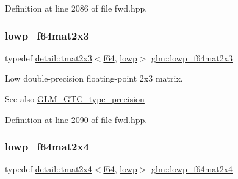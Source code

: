 Definition at line 2086 of file fwd.\+hpp.

\mbox{\label{group__gtc__type__precision_ga2add7d48faba102f53fbad2e14dfed12}} 
\subsubsection{\texorpdfstring{lowp\+\_\+f64mat2x3}{lowp\_f64mat2x3}}
{\footnotesize\ttfamily typedef \hyperlink{structglm_1_1detail_1_1tmat2x3}{detail\+::tmat2x3}$<$\hyperlink{group__gtc__type__precision_ga2bba392e555124b36cde6abba349bab3}{f64}, \hyperlink{namespaceglm_a0f04f086094c747d227af4425893f545ae161af3fc695e696ce3bf69f7332bc2d}{lowp}$>$ \hyperlink{group__gtc__type__precision_ga2add7d48faba102f53fbad2e14dfed12}{glm\+::lowp\+\_\+f64mat2x3}}

Low double-\/precision floating-\/point 2x3 matrix. \begin{DoxySeeAlso}{See also}
\hyperlink{group__gtc__type__precision}{G\+L\+M\+\_\+\+G\+T\+C\+\_\+type\+\_\+precision} 
\end{DoxySeeAlso}


Definition at line 2090 of file fwd.\+hpp.

\mbox{\label{group__gtc__type__precision_ga38366c50f2a2755c49110c7fc1441683}} 
\subsubsection{\texorpdfstring{lowp\+\_\+f64mat2x4}{lowp\_f64mat2x4}}
{\footnotesize\ttfamily typedef \hyperlink{structglm_1_1detail_1_1tmat2x4}{detail\+::tmat2x4}$<$\hyperlink{group__gtc__type__precision_ga2bba392e555124b36cde6abba349bab3}{f64}, \hyperlink{namespaceglm_a0f04f086094c747d227af4425893f545ae161af3fc695e696ce3bf69f7332bc2d}{lowp}$>$ \hyperlink{group__gtc__type__precision_ga38366c50f2a2755c49110c7fc1441683}{glm\+::lowp\+\_\+f64mat2x4}}

